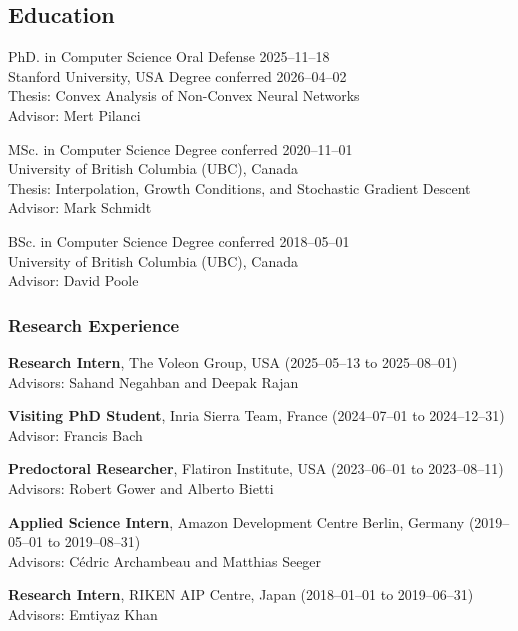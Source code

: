 \subsection{Education}

\begin{description}[leftmargin=\mleftsize,style=nextline,font=\normalfont\space]
    PhD. in Computer Science \hfill Oral Defense 2025--11--18\\
    Stanford University, USA \hfill Degree conferred 2026--04--02\\
    Thesis: Convex Analysis of Non-Convex Neural Networks\\
    Advisor: Mert Pilanci

    MSc. in Computer Science \hfill Degree conferred 2020--11--01\\
    University of British Columbia (UBC), Canada	\\
    Thesis: Interpolation, Growth Conditions, and Stochastic Gradient Descent \\
    Advisor: Mark Schmidt

    BSc. in Computer Science \hfill Degree conferred 2018--05--01\\
    University of British Columbia (UBC), Canada \\
    Advisor: David Poole
\end{description}

\subsubsection{Research Experience}
\begin{description}[leftmargin=\mleftsize,style=nextline,font=\normalfont\space]
    \item[2025]
          \textbf{Research Intern}, The Voleon Group, USA  \hfill (2025--05--13 to 2025--08--01)
          \\
          Advisors: Sahand Negahban and Deepak Rajan
    \item[2024]
          \textbf{Visiting PhD Student}, Inria Sierra Team, France \hfill (2024--07--01 to 2024--12--31) 
          \\
          Advisor: Francis Bach 
    \item[2023]
          \textbf{Predoctoral Researcher}, Flatiron Institute, USA \hfill (2023--06--01 to 2023--08--11) 
          \\
          Advisors: Robert Gower and Alberto Bietti 
    \item[2019]
          \textbf{Applied Science Intern}, Amazon Development Centre Berlin, Germany \hfill (2019--05--01 to 2019--08--31) 
          \\
          Advisors: Cédric Archambeau and Matthias Seeger
    \item[2018]
          \textbf{Research Intern}, RIKEN AIP Centre, Japan \hfill (2018--01--01 to 2019--06--31) 
          \\
          Advisors: Emtiyaz Khan 
\end{description}

